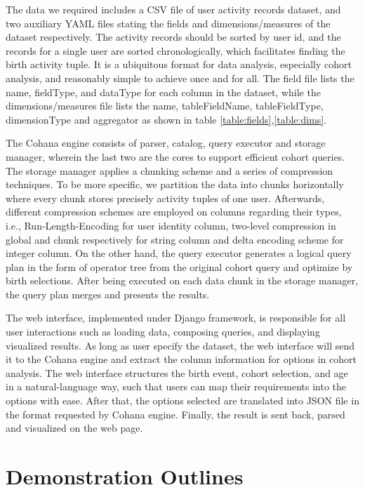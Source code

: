 \documentclass[10pt,conference,letterpaper]{IEEEtran}
\begin{document}
The data we required includes a CSV file of user activity records dataset, and two auxiliary YAML files stating the fields and dimensions/measures of the dataset respectively. The activity records should be sorted by user id, and the records for a single user are sorted chronologically, which facilitates finding the birth activity tuple. It is a ubiquitous format for data analysis, especially cohort analysis, and reasonably simple to achieve once and for all. The field file lists the name, fieldType, and dataType for each column in the dataset, while the dimensions/measures file lists the name,  tableFieldName, tableFieldType, dimensionType and aggregator as shown in table \ref{table:fields},\ref{table:dims}.

The Cohana engine consists of parser, catalog, query executor and storage manager, wherein the last two are the cores to support efficient cohort queries. The storage manager applies a chunking scheme and a series of compression techniques. To be more specific, we partition the data into chunks horizontally where every chunk stores precisely activity tuples of one user. Afterwards, different compression schemes are employed on columns regarding their types, i.e., Run-Length-Encoding for user identity column, two-level compression in global and chunk respectively for string column and delta encoding scheme for integer column. On the other hand, the query executor generates a logical query plan in the form of operator tree from the original cohort query and optimize by birth selections. After being executed on each data chunk in the storage manager, the query plan merges and presents the results.

The web interface, implemented under Django framework, is responsible for all user interactions such as loading data, composing queries, and displaying visualized results. As long as user specify the dataset, the web interface will send it to the Cohana engine and extract the column information for options in cohort analysis. The web interface structures the birth event, cohort selection, and age in a natural-language way, such that users can map their requirements into the options with ease. After that, the options selected are translated into JSON file in the format requested by Cohana engine. Finally, the result is sent back, parsed and visualized on the web page.

\section{Demonstration Outlines}
\end{document}
